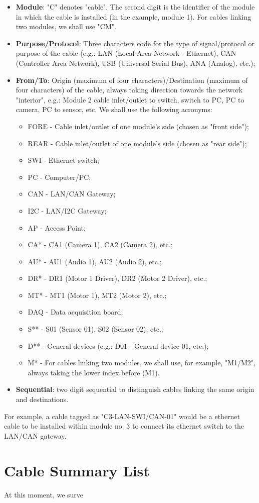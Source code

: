 \begin{itemize}
    \item \textbf{Module}: "C" denotes "cable". The second digit is the identifier of the module in which the cable is installed (in the example, module 1). For cables linking two modules, we shall use "CM".
    \item \textbf{Purpose/Protocol}: Three characters code for the type of signal/protocol or purpose of the cable (e.g.: LAN (Local Area Network - Ethernet), CAN (Controller Area Network), USB (Universal Serial Bus), ANA (Analog), etc.);
    \item \textbf{From/To}: Origin (maximum of four characters)/Destination (maximum of four characters) of the cable, always taking direction towards the network "interior", e.g.: Module 2 cable inlet/outlet to switch, switch to PC, PC to camera, PC to sensor, etc. We shall use the following acronyms:
        \begin{itemize}
            \item FORE - Cable inlet/outlet of one module's side (chosen as "front side");
            \item REAR - Cable inlet/outlet of one module's side (chosen as "rear side");
            \item SWI - Ethernet switch;
            \item PC - Computer/PC;
            \item CAN - LAN/CAN Gateway;
            \item I2C - LAN/I2C Gateway;
            \item AP - Access Point;
            \item CA* - CA1 (Camera 1), CA2 (Camera 2), etc.;
            \item AU* - AU1 (Audio 1), AU2 (Audio 2), etc.;
            \item DR* - DR1 (Motor 1 Driver), DR2 (Motor 2 Driver), etc.;
            \item MT* - MT1 (Motor 1), MT2 (Motor 2), etc.;
            \item DAQ - Data acquisition board;
            \item S** - S01 (Sensor 01), S02 (Sensor 02), etc.;
            \item D** - General devices (e.g.: D01 - General device 01, etc.);
            \item M* - For cables linking two modules, we shall use, for example, "M1/M2", always taking the lower index before (M1).
        \end{itemize}
    \item \textbf{Sequential}: two digit sequential to distinguish cables linking the same origin and destinations.
\end{itemize}

For example, a cable tagged as "C3-LAN-SWI/CAN-01" would be a ethernet cable to be installed within module no. 3 to connect its ethernet switch to the LAN/CAN gateway.

\section{Cable Summary List} \label{CABLE_LIST}
At this moment, we surve